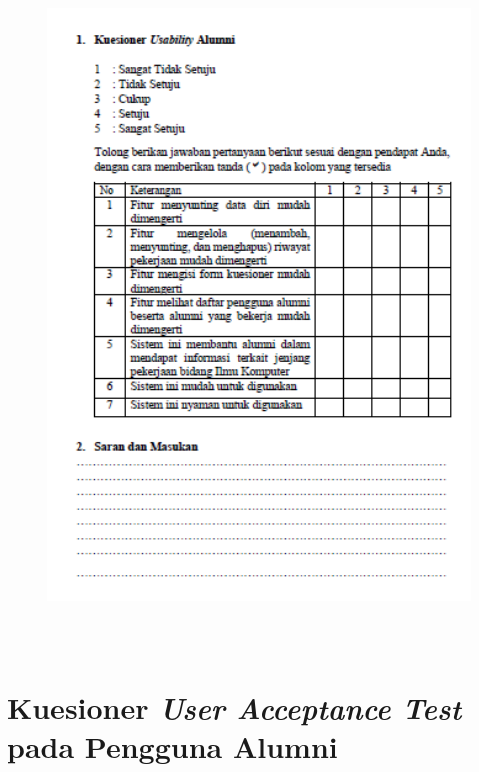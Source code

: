\begin{figure}[H]
	\centering
	\includegraphics[width=15cm,height=18cm]{gambar/UAT/ku_alumni}
	\label{ku_alumni}
\end{figure}



\chapter{Kuesioner \textit{User Acceptance Test} pada Pengguna Alumni}

